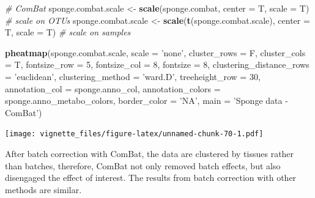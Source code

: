\documentclass[]{book}
\newenvironment{Shaded}{\begin{snugshade}}{\end{snugshade}}
\newcommand{\KeywordTok}[1]{\textcolor[rgb]{0.13,0.29,0.53}{\textbf{#1}}}
\newcommand{\DataTypeTok}[1]{\textcolor[rgb]{0.13,0.29,0.53}{#1}}
\newcommand{\DecValTok}[1]{\textcolor[rgb]{0.00,0.00,0.81}{#1}}
\newcommand{\StringTok}[1]{\textcolor[rgb]{0.31,0.60,0.02}{#1}}
\newcommand{\CommentTok}[1]{\textcolor[rgb]{0.56,0.35,0.01}{\textit{#1}}}
\newcommand{\NormalTok}[1]{#1}
\begin{document}
\begin{Shaded}
\begin{Highlighting}[]
\CommentTok{# ComBat }
\NormalTok{sponge.combat.scale <-}\StringTok{ }\KeywordTok{scale}\NormalTok{(sponge.combat, }\DataTypeTok{center =}\NormalTok{ T, }\DataTypeTok{scale =}\NormalTok{ T) }
\CommentTok{# scale on OTUs}
\NormalTok{sponge.combat.scale <-}\StringTok{ }\KeywordTok{scale}\NormalTok{(}\KeywordTok{t}\NormalTok{(sponge.combat.scale), }\DataTypeTok{center =}\NormalTok{ T, }\DataTypeTok{scale =}\NormalTok{ T) }
\CommentTok{# scale on samples}

\KeywordTok{pheatmap}\NormalTok{(sponge.combat.scale, }
         \DataTypeTok{scale =} \StringTok{'none'}\NormalTok{, }
         \DataTypeTok{cluster_rows =}\NormalTok{ F, }
         \DataTypeTok{cluster_cols =}\NormalTok{ T, }
         \DataTypeTok{fontsize_row =} \DecValTok{5}\NormalTok{, }\DataTypeTok{fontsize_col =} \DecValTok{8}\NormalTok{,}
         \DataTypeTok{fontsize =} \DecValTok{8}\NormalTok{,}
         \DataTypeTok{clustering_distance_rows =} \StringTok{'euclidean'}\NormalTok{,}
         \DataTypeTok{clustering_method =} \StringTok{'ward.D'}\NormalTok{,}
         \DataTypeTok{treeheight_row =} \DecValTok{30}\NormalTok{,}
         \DataTypeTok{annotation_col =}\NormalTok{ sponge.anno_col,}
         \DataTypeTok{annotation_colors =}\NormalTok{ sponge.anno_metabo_colors,}
         \DataTypeTok{border_color =} \StringTok{'NA'}\NormalTok{,}
         \DataTypeTok{main =} \StringTok{'Sponge data - ComBat'}\NormalTok{)}
\end{Highlighting}
\end{Shaded}

\texttt{[image: vignette\_files/figure-latex/unnamed-chunk-70-1.pdf]}

After batch correction with ComBat, the data are clustered by tissues
rather than batches, therefore, ComBat not only removed batch effects,
but also disengaged the effect of interest. The results from batch
correction with other methods are similar.
\end{document}
